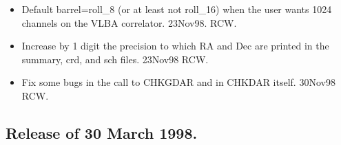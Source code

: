 \documentclass{report}
\begin{document}
\begin{itemize}
\item  Default barrel=roll\_8 (or at least not roll\_16) when the
       user wants 1024 channels on the VLBA correlator.  23Nov98. RCW.

\item  Increase by 1 digit the precision to which RA and Dec are
       printed in the summary, crd, and sch files. 23Nov98 RCW.

\item  Fix some bugs in the call to CHKGDAR and in CHKDAR itself.
       30Nov98  RCW.

\end{itemize}

\subsection{\label{SSSEC:06MAR98}Release of 30 March 1998.}
\end{document}
